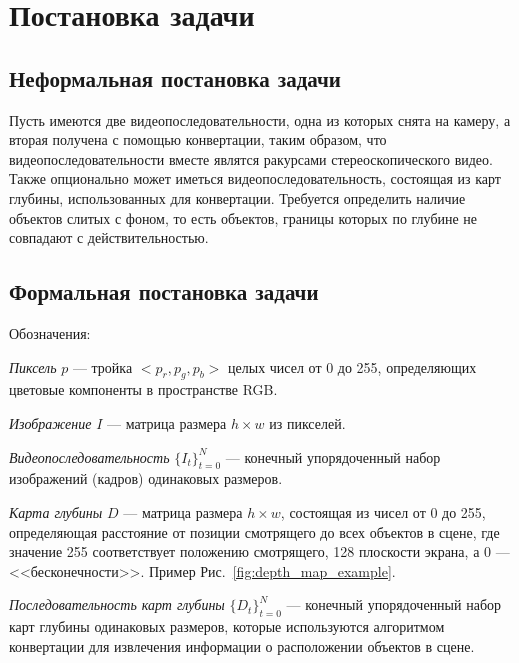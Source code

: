 \documentclass[14pt, a4paper]{extarticle}
\begin{document}
\newpage
\section{Постановка задачи}

\subsection{Неформальная постановка задачи}

Пусть имеются две видеопоследовательности, одна из которых снята на камеру, а вторая получена с помощью конвертации, таким образом, что видеопоследовательности вместе являтся ракурсами стереоскопического видео. Также опционально может иметься видеопоследовательность, состоящая из карт глубины, использованных для конвертации. Требуется определить наличие объектов слитых с фоном, то есть объектов, границы которых по глубине не совпадают с действительностью.

\subsection{Формальная постановка задачи}

Обозначения:

\textit{Пиксель} $p$ --- тройка $<p_r,p_g,p_b>$ целых чисел от 0 до 255, определяющих цветовые компоненты в пространстве RGB.

\textit{Изображение} $I$ --- матрица размера $h \times w$ из пикселей.

\textit{Видеопоследовательность} $\{I_t\}_{t=0}^N$ --- конечный упорядоченный набор изображений (кадров) одинаковых размеров.



\textit{Карта глубины} $D$ --- матрица размера $h \times w$, состоящая из чисел от 0 до 255,
определяющая расстояние от позиции смотрящего до всех объектов в сцене, 
где значение 255 соответствует положению смотрящего, 128 плоскости экрана, 
а 0 --- <<бесконечности>>. Пример Рис.~\ref{fig:depth_map_example}.

\textit{Последовательность карт глубины} $\{D_t\}_{t=0}^N$ --- конечный упорядоченный 
набор карт глубины одинаковых размеров, которые используются алгоритмом конвертации 
для извлечения информации о расположении объектов в сцене.
\end{document}
